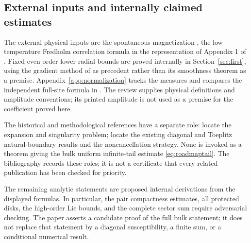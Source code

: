 \documentclass[11pt]{article}
\numberwithin{equation}{section}
\theoremstyle{definition}
\begin{document}
\subsection{External inputs and internally claimed estimates}
The external physical inputs are the spontaneous magnetization
\cite{Yang1952}, the low-temperature Fredholm correlation formula
\cite{PalmerTracy1981} in the representation of Appendix 1 of
\cite{TW2014}. Fixed-even-order lower radial bounds are proved
internally in Section~\ref{sec:first}, using the gradient method of
\cite{TW2014} as precedent rather than its smoothness theorem as a
premise. Appendix~\ref{app:normalization}
tracks the measures and compares the independent full-site formula
in \cite{Boukraa2008}. The review \cite{McCoyMaillard2012}
supplies physical definitions and amplitude conventions; its printed
amplitude is not used as a premise for the coefficient proved here.

The historical and methodological references have a separate role:
\cite{WMTB1976,GuttmannEnting1996,Nickel1999,Nickel2000}
locate the expansion and singularity problem;
\cite{TW2013,TW2017Toeplitz} locate the existing diagonal and
Toeplitz natural-boundary results and the noncancellation strategy.
None is invoked as a theorem giving the bulk uniform infinite-tail
estimate \eqref{eq:roadmaptail}. The bibliography records these
roles; it is not a certificate that every related publication has
been checked for priority.

The remaining analytic statements are proposed internal derivations
from the displayed formulas. In particular, the pair compactness
estimates, all protected disks, the high-order Lie bounds, and
the complete sector sum require adversarial checking.
The paper asserts a candidate proof of the full bulk statement;
it does not replace that statement by a diagonal susceptibility,
a finite sum, or a conditional numerical result.
\end{document}
